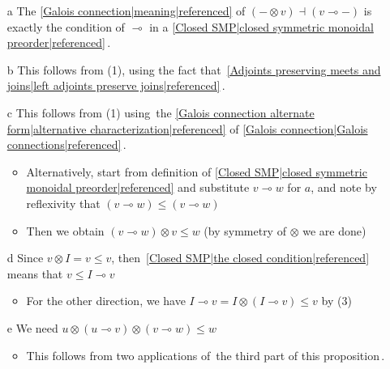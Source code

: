 \begin{itemize}
    \item[a] The \ref{Galois connection|meaning|referenced} of $(- \otimes v) \dashv (v \multimap -)$ is \,exactly the condition of $\multimap$ in a \ref{Closed SMP|closed symmetric monoidal preorder|referenced}\,.
    \item[b] This follows from (1), using the fact that \,\ref{Adjoints preserving meets and joins|left adjoints preserve joins|referenced}\,.
    \item[c] This follows from (1) using \,the \ref{Galois connection alternate form|alternative characterization|referenced} of \ref{Galois connection|Galois connections|referenced}\,.
          \begin{itemize}
            \item Alternatively, start from definition of \ref{Closed SMP|closed symmetric monoidal preorder|referenced} and substitute $v \multimap w$ for $a$, and note by reflexivity that  $(v \multimap w) \leq (v \multimap w)$
            \item Then we obtain $(v \multimap w) \otimes v \leq w$ (by symmetry of $\otimes$ we are done)
          \end{itemize}
    \item[d] Since $v \otimes I = v \leq v$, then \,\ref{Closed SMP|the closed condition|referenced}\, means that $v \leq I \multimap v$
          \begin{itemize}
            \item For the other direction, we have $I \multimap v = I \otimes (I \multimap v) \leq v$ by (3)
          \end{itemize}
    \item[e] We need $u \otimes (u \multimap v) \otimes (v \multimap w) \leq w$
          \begin{itemize}
            \item This follows from two applications of \,the third part of this proposition\,.
          \end{itemize}
  \end{itemize}